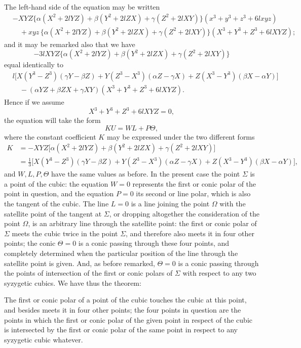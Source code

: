 \documentclass[11pt]{article}
\begin{document}
The left-hand side of the equation may be written
\begin{align*}
&-X Y Z\bigl\{\alpha(X^2 + 2 l Y Z) + \beta(Y^2 + 2 l Z X) + \gamma(Z^2 + 2 l X Y)\bigr\}(x^3 + y^3 + z^3 + 6 l x y z) \\
&\quad + x y z\,\bigl\{\alpha(X^2 + 2 l Y Z) + \beta(Y^2 + 2 l Z X) + \gamma(Z^2 + 2 l X Y)\bigr\}(X^3 + Y^3 + Z^3 + 6 l X Y Z);
\end{align*}
and it may be remarked also that we have
\[
-3 l X Y Z \bigl\{\alpha(X^2 + 2 l Y Z) + \beta(Y^2 + 2 l Z X) + \gamma(Z^2 + 2 l X Y)\bigr\}
\]
equal identically to
\begin{align*}
&l\bigl[X(Y^3 - Z^3)(\gamma Y - \beta Z) + Y(Z^3 - X^3)(\alpha Z - \gamma X) + Z(X^3 - Y^3)(\beta X - \alpha Y)\bigr] \\
&\quad - (\alpha Y Z + \beta Z X + \gamma X Y)(X^3 + Y^3 + Z^3 + 6 l X Y Z).
\end{align*}
Hence if we assume
\[
X^3 + Y^3 + Z^3 + 6 l X Y Z = 0,
\]
the equation will take the form
\[
K U = W L + P \Theta,
\]
where the constant coefficient $K$ may be expressed under the two different forms
\begin{align*}
K &= -X Y Z\bigl[\alpha(X^2 + 2 l Y Z) + \beta(Y^2 + 2 l Z X) + \gamma(Z^2 + 2 l X Y)\bigr] \\
  &= \tfrac{1}{3}\bigl[X(Y^3 - Z^3)(\gamma Y - \beta Z) + Y(Z^3 - X^3)(\alpha Z - \gamma X) + Z(X^3 - Y^3)(\beta X - \alpha Y)\bigr],
\end{align*}
and $W, L, P, \Theta$ have the same values as before. In the present case the point $\Sigma$ is a point of the cubic: the equation $W = 0$ represents the first or conic polar of the point in question, and the equation $P = 0$ its second or line polar, which is also the tangent of the cubic. The line $L = 0$ is a line joining the point $\Omega$ with the satellite point of the tangent at $\Sigma$, or dropping altogether the consideration of the point $\Omega$, is an arbitrary line through the satellite point: the first or conic polar of $\Sigma$ meets the cubic twice in the point $\Sigma$, and therefore also meets it in four other points; the conic $\Theta = 0$ is a conic passing through these four points, and completely determined when the particular position of the line through the satellite point is given. And, as before remarked, $\Theta = 0$ is a conic passing through the points of intersection of the first or conic polars of $\Sigma$ with respect to any two syzygetic cubics. We have thus the theorem:

The first or conic polar of a point of the cubic touches the cubic at this point, and besides meets it in four other points; the four points in question are the points in which the first or conic polar of the given point in respect of the cubic is intersected by the first or conic polar of the same point in respect to any syzygetic cubic whatever.
\end{document}
